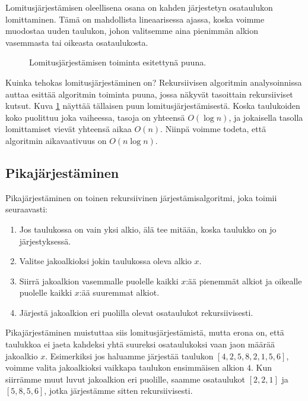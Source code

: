 Lomitusjärjestämisen oleellisena osana on kahden järjestetyn osataulukon
lomittaminen. Tämä on mahdollista lineaarisessa ajassa, koska
voimme muodostaa uuden taulukon, johon valitsemme aina pienimmän
alkion vasemmasta tai oikeasta osataulukosta.

\begin{figure}
\center
{}
\caption{Lomitusjärjestämisen toiminta esitettynä puuna.}
\label{fig:lomjar}
\end{figure}

Kuinka tehokas lomitusjärjestäminen on?
Rekursiivisen algoritmin analysoinnissa auttaa esittää
algoritmin toiminta puuna,
jossa näkyvät tasoittain rekursiiviset kutsut.
Kuva \ref{fig:lomjar} näyttää tällaisen puun lomitusjärjestämisestä.
Koska taulukoiden koko puolittuu joka vaiheessa,
tasoja on yhteensä $O(\log n)$,
ja jokaisella tasolla lomittamiset vievät yhteensä aikaa $O(n)$.
Niinpä voimme todeta, että algoritmin aikavaativuus on $O(n \log n)$.

\subsection{Pikajärjestäminen}

Pikajärjestäminen on toinen rekursiivinen järjestämisalgoritmi,
joka toimii seuraavasti:

\begin{enumerate}
\item Jos taulukossa on vain yksi alkio,
älä tee mitään, koska taulukko on jo järjestyksessä.
\item Valitse jakoalkioksi jokin taulukossa oleva alkio $x$.
\item Siirrä jakoalkion vasemmalle puolelle kaikki $x$:ää pienemmät alkiot
ja oikealle puolelle kaikki $x$:ää suuremmat alkiot.
\item Järjestä jakoalkion eri puolilla olevat osataulukot rekursiivisesti.
\end{enumerate}

Pikajärjestäminen muistuttaa siis lomitusjärjestämistä,
mutta erona on, että taulukkoa ei jaeta kahdeksi yhtä suureksi
osataulukoksi vaan jaon määrää jakoalkio $x$.
Esimerkiksi jos haluamme järjestää taulukon $[4,2,5,8,2,1,5,6]$,
voimme valita jakoalkioksi vaikkapa taulukon ensimmäisen alkion $4$.
Kun siirrämme muut luvut jakoalkion eri puolille,
saamme osataulukot $[2,2,1]$ ja $[5,8,5,6]$, jotka järjestämme
sitten rekursiivisesti.

